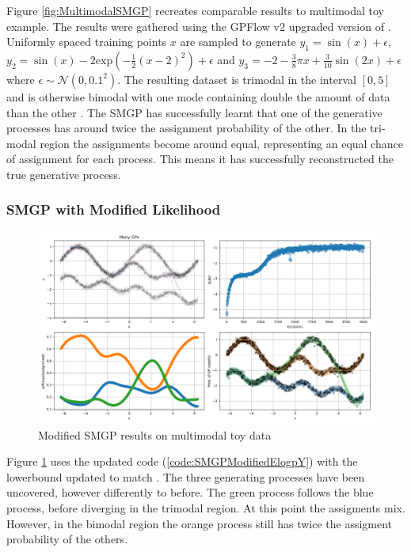 \documentclass[12pt,a4paper]{report}
\theoremstyle{definition}
\begin{document}
Figure \ref{fig:MultimodalSMGP} recreates comparable results to \citet{Kaiser2020} multimodal toy example.
The results were gathered using the GPFlow v2 upgraded version of \citet{Lui2021}.
Uniformly spaced training points $x$ are sampled to generate $y_{1} = \sin (x) + \epsilon$, $y_{2} = \sin(x) - 2 \textrm{exp}(-\frac{1}{2}(x - 2)^2) + \epsilon$ and $y_{3} = -2 -\frac{3}{8}\pi x + \frac{3}{10} \sin(2x) + \epsilon$ where $\epsilon \sim \mathcal{N}(0, 0.1^2)$. 
The resulting dataset is trimodal in the interval $[0, 5]$ and is otherwise bimodal with one mode containing double the amount of data than the other \citep{Kaiser2020}.
The SMGP has successfully learnt that one of the generative processes has around twice the assignment probability of the other.
In the tri-modal region the assignments become around equal, representing an equal chance of assignment for each process. This means it has successfully reconstructed the true generative process.

\subsubsection{SMGP with Modified Likelihood}

\begin{figure}[H]
    \centering
    \includegraphics[width=\linewidth]{demo_tf2_modified.png}
    \caption{Modified SMGP results on multimodal toy data}
    \label{fig:MultimodalSMGPModified}
\end{figure}

Figure \ref{fig:MultimodalSMGPModified} uses the updated code (\ref{code:SMGPModifiedElogpY}) with the lowerbound updated to match \citet{Kaiser2020}.
The three generating processes have been uncovered, however differently to before.
The green process follows the blue process, before diverging in the trimodal region.
At this point the assigments mix. 
However, in the bimodal region the orange process still has twice the assigment probability of the others.
\end{document}
